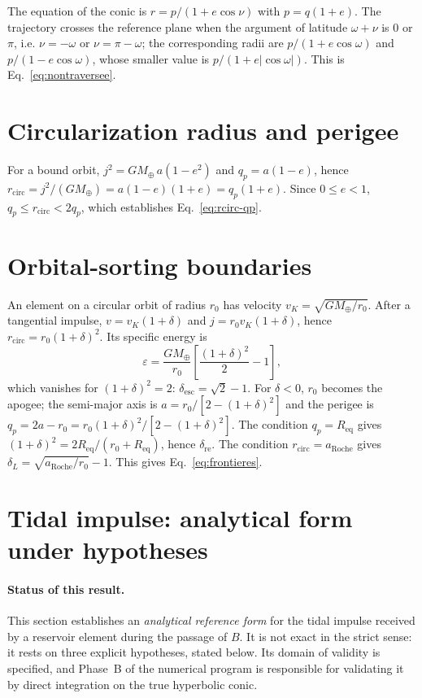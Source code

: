 \documentclass[11pt,a4paper,openany]{report}
\newcommand{\Mt}{M_{\oplus}}
\newcommand{\Req}{R_{\mathrm{eq}}}
\newcommand{\aR}{a_{\mathrm{Roche}}}
\begin{document}
The equation of the conic is $r=p/(1+e\cos\nu)$ with $p=q(1+e)$. The trajectory crosses the
reference plane when the argument of latitude $\omega+\nu$ is $0$ or $\pi$, i.e. $\nu=-\omega$ or
$\nu=\pi-\omega$; the corresponding radii are $p/(1+e\cos\omega)$ and $p/(1-e\cos\omega)$, whose
smaller value is $p/(1+e|\cos\omega|)$. This is Eq.~\eqref{eq:nontraversee}.

\section{Circularization radius and perigee}
\label{app:rcirc}

For a bound orbit, $j^2=G\Mt\,a(1-e^2)$ and $q_p=a(1-e)$, hence
$r_{\mathrm{circ}}=j^2/(G\Mt)=a(1-e)(1+e)=q_p(1+e)$. Since $0\le e<1$,
$q_p\le r_{\mathrm{circ}}<2q_p$, which establishes Eq.~\eqref{eq:rcirc-qp}.

\section{Orbital-sorting boundaries}
\label{app:tri}

An element on a circular orbit of radius $r_0$ has velocity $v_K=\sqrt{G\Mt/r_0}$. After a tangential
impulse, $v=v_K(1+\delta)$ and $j=r_0v_K(1+\delta)$, hence
$r_{\mathrm{circ}}=r_0(1+\delta)^2$. Its specific energy is
\begin{equation}
\varepsilon=\frac{G\Mt}{r_0}\left[\frac{(1+\delta)^2}{2}-1\right],
\end{equation}
which vanishes for $(1+\delta)^2=2$: $\delta_{\mathrm{esc}}=\sqrt2-1$. For $\delta<0$, $r_0$ becomes
the apogee; the semi-major axis is $a=r_0/[2-(1+\delta)^2]$ and the perigee is
$q_p=2a-r_0=r_0(1+\delta)^2/[2-(1+\delta)^2]$. The condition $q_p=\Req$ gives
$(1+\delta)^2=2\Req/(r_0+\Req)$, hence $\delta_{\mathrm{re}}$. The condition
$r_{\mathrm{circ}}=\aR$ gives $\delta_L=\sqrt{\aR/r_0}-1$. This gives Eq.~\eqref{eq:frontieres}.

\section{Tidal impulse: analytical form under hypotheses}
\label{app:impulsion}

\paragraph{Status of this result.}
This section establishes an \emph{analytical reference form} for the tidal impulse received by a
reservoir element during the passage of $B$. It is not exact in the strict sense: it rests on three
explicit hypotheses, stated below. Its domain of validity is specified, and Phase~B of the
numerical program is responsible for validating it by direct integration on the true hyperbolic
conic.
\end{document}
